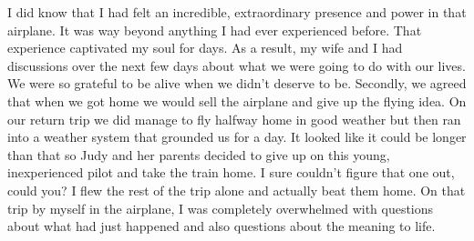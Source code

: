 \documentclass[oneside,12pt]{book}
\begin{document}
I did know that I had felt an incredible, extraordinary presence and power in that airplane. It was way beyond anything I had ever experienced before. That experience captivated my soul for days. As a result, my wife and I had discussions over the next few days about what we were going to do with our lives. We were so grateful to be alive when we didn't deserve to be. Secondly, we agreed that when we got home we would sell the airplane and give up the flying idea. On our return trip we did manage to fly halfway home in good weather but then ran into a weather system that grounded us for a day. It looked like it could be longer than that so Judy and her parents decided to give up on this young, inexperienced pilot and take the train home. I sure couldn't figure that one out, could you? I flew the rest of the trip alone and actually beat them home. On that trip by myself in the airplane, I was completely overwhelmed with questions about what had just happened and also questions about the meaning to life.
\end{document}
